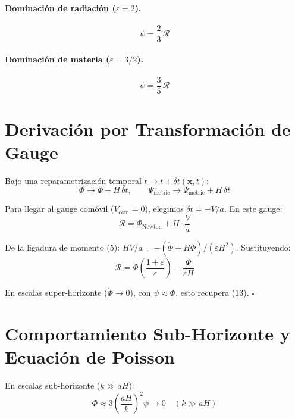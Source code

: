 \documentclass[12pt,a4paper]{article}
\begin{document}
\paragraph{Dominación de radiación ($\varepsilon = 2$).}
\begin{equation}
\psi = \frac{2}{3}\,\mathcal{R} \tag{16}
\end{equation}

\paragraph{Dominación de materia ($\varepsilon = 3/2$).}
\begin{equation}
\psi = \frac{3}{5}\,\mathcal{R} \tag{17}
\end{equation}

\section{Derivación por Transformación de Gauge}

Bajo una reparametrización temporal $t \to t + \delta t(\mathbf{x}, t)$:
\begin{equation}
\Phi \to \Phi - H\,\delta t, \qquad \Psi_\text{metric} \to \Psi_\text{metric} + H\,\delta t \tag{18}
\end{equation}

Para llegar al gauge comóvil ($V_\text{com} = 0$), elegimos $\delta t = -V/a$. En este gauge:
\begin{equation}
\mathcal{R} = \Phi_\text{Newton} + H \cdot \frac{V}{a} \tag{19}
\end{equation}

De la ligadura de momento (5): $HV/a = -(\dot{\Phi} + H\Phi)/(\varepsilon H^2)$. Sustituyendo:
\begin{equation}
\mathcal{R} = \Phi\left(\frac{1+\varepsilon}{\varepsilon}\right) - \frac{\dot{\Phi}}{\varepsilon H} \tag{20}
\end{equation}

En escalas super-horizonte ($\dot{\Phi} \to 0$), con $\psi \approx \Phi$, esto recupera (13). $\square$

\section{Comportamiento Sub-Horizonte y Ecuación de Poisson}

En escalas sub-horizonte ($k \gg aH$):
\begin{equation}
\Phi \approx 3\left(\frac{aH}{k}\right)^2 \psi \to 0 \quad (k \gg aH) \tag{21}
\end{equation}
\end{document}
